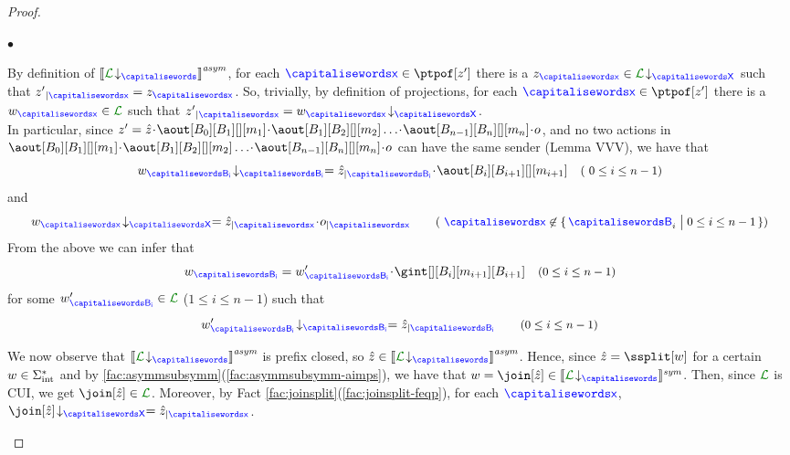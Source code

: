 \begin{proof}
\begin{description}
%
%
%
%
$\bullet$

 By definition of $\asem{\proj{\clang}{}}$, 
for each 
$\px\in\ptpof[{z'}]$  there is a $z_{\px}\in\proj{\clang}{X}$ such that
$\filter{z'}{\px}=z_{\px}$. So, trivially, by definition of projections,
for each $\px\in\ptpof[z']$  there is a $\acword_{\px}\in{\clang}$ such that
$\filter{z'}{\px}=\proj{\acword_{\px}}{X}$.\\
 In particular,
 since $z'=\hat z \cat\aout[B_0][B_1][][m_1]\cat\aout[B_1][B_2][][m_2]\ldots\cat\aout[B_{n-1}][B_n][][m_n]\cat o$, and no two actions in $\aout[B_0][B_1][][m_1]\cat\aout[B_1][B_2][][m_2]\ldots\cat\aout[B_{n-1}][B_n][][m_n]\cat o$ can have the same sender (Lemma VVV), we have that 
  $$
   \proj{\acword_{\ptp[B_{i}]}}{B_{i}}= \filter{\hat z}{\ptp[B_{i}]}\cat\aout[B_{i}][B_{i+1}][][m_{i+1}]
  \quad \text{\small ( $0\leq i \leq n-1$)}$$
  and
  $$\proj{\acword_{\px}}{X} = \filter{\hat z}{\px}\cat  \filter{o}{\px} \qquad 
   \text{\small ( $\px\not\in\Set{\q_i \sst 0\leq i\leq n-1}$)}$$
From the above  we can infer that  
$$
\acword_{\ptp[B_{i}]} = \acword'_{\ptp[B_{i}]}\cat \gint[][{B_i}][m_{i+1}][{B_{i+1}}]
 \quad \text{\small ($0\leq i \leq n-1$)}
$$
      for some $\acword'_{\ptp[B_{i}]} \in\clang$ ($1\leq i \leq n-1$) such that
$$
 \proj{\acword'_{\ptp[B_{i}]}}{B_i}= \filter{\hat z}{\ptp[B_{i}]}  \qquad \text{\small ($0\leq i \leq n-1$)} $$

 We now observe that  $\asem{\proj{\clang}{}}$ is prefix closed, 
so $\hat z\in \asem{\proj{\clang}{}}$. 
Hence, since $\hat z = \ssplit[\acword]$ for a certain $w\in\Sigma_{\text{int}}^*$ and by  
\cref{fac:asymmsubsymm}(\ref{fac:asymmsubsymm-aimps}), we have that
$\acword=\join[\hat z]\in\ssem{\proj{\clang}{}}$. Then,
since $\clang$ is CUI, we get $\join[\hat z]\in\clang$. 
Moreover, by Fact \ref{fac:joinsplit}(\ref{fac:joinsplit-feqp}), for each $\px$,
$\proj{\join[\hat z]}{X}=\filter{\hat z}{\px}$. 



\end{description}
\end{proof}
